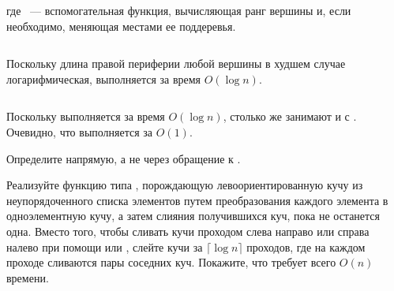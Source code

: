 \begin{frame}[fragile]{}
\inputminted[firstline=23, lastline=26] {haskell}{code/Heap.hs}

где ~--- вспомогательная функция, вычисляющая ранг
вершины  и, если необходимо, меняющая местами ее
поддеревья.

\inputminted[firstline=30, lastline=35] {haskell}{code/Heap.hs}

Поскольку длина правой периферии любой вершины в худшем случае
логарифмическая,  выполняется за время $O(\log n)$.
\end{frame}

\begin{frame}[fragile]{}
\inputminted[firstline=36, lastline=38] {haskell}{code/Heap.hs}

Поскольку  выполняется за время $O(\log n)$, столько
же занимают и  с .\\

Очевидно, что  выполняется за $O(1)$. 
\end{frame}

\ifanswers
\begin{frame}[fragile]{}
\begin{exercise}\label{ex:3.2}
  Определите  напрямую, а не через обращение к .
\end{exercise}

\begin{exercise}\label{ex:3.3}
  Реализуйте функцию  типа ,
  порождающую левоориентированную кучу из неупорядоченного списка
  элементов путем преобразования каждого элемента в одноэлементную
  кучу, а затем слияния получившихся куч, пока не останется
  одна. Вместо того, чтобы сливать кучи проходом слева направо или
  справа налево при помощи  или ,
  слейте кучи за $\lceil \log n \rceil$ проходов, где на каждом
  проходе сливаются пары соседних куч. Покажите, что
   требует всего $O(n)$ времени.
\end{exercise}
\end{frame}
\fi 

